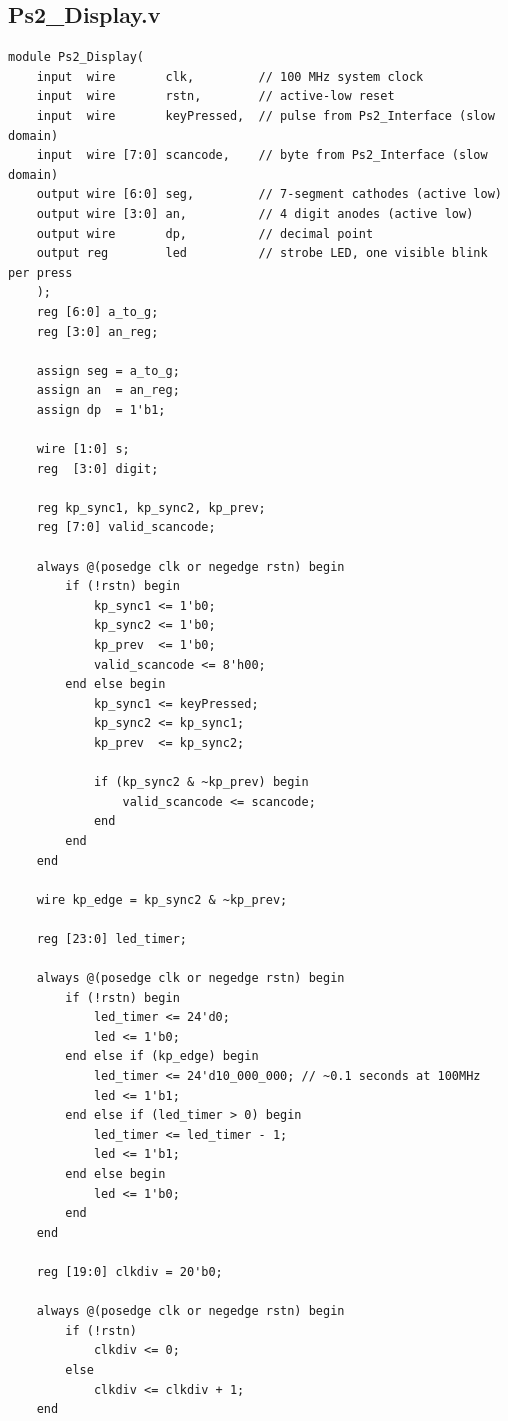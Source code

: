 \documentclass[11pt,a4paper]{article}
\begin{document}
\newpage
\subsection*{Ps2\_Display.v}
\begin{lstlisting}
module Ps2_Display(
    input  wire       clk,         // 100 MHz system clock
    input  wire       rstn,        // active-low reset
    input  wire       keyPressed,  // pulse from Ps2_Interface (slow domain)
    input  wire [7:0] scancode,    // byte from Ps2_Interface (slow domain)
    output wire [6:0] seg,         // 7-segment cathodes (active low)
    output wire [3:0] an,          // 4 digit anodes (active low)
    output wire       dp,          // decimal point
    output reg        led          // strobe LED, one visible blink per press
    );
    reg [6:0] a_to_g;
    reg [3:0] an_reg;

    assign seg = a_to_g;
    assign an  = an_reg;
    assign dp  = 1'b1;
    
    wire [1:0] s;    
    reg  [3:0] digit;

    reg kp_sync1, kp_sync2, kp_prev;
    reg [7:0] valid_scancode;
    
    always @(posedge clk or negedge rstn) begin
        if (!rstn) begin
            kp_sync1 <= 1'b0;
            kp_sync2 <= 1'b0;
            kp_prev  <= 1'b0;
            valid_scancode <= 8'h00;
        end else begin
            kp_sync1 <= keyPressed;
            kp_sync2 <= kp_sync1;
            kp_prev  <= kp_sync2;

            if (kp_sync2 & ~kp_prev) begin
                valid_scancode <= scancode;
            end
        end
    end
    
    wire kp_edge = kp_sync2 & ~kp_prev;

    reg [23:0] led_timer;
    
    always @(posedge clk or negedge rstn) begin
        if (!rstn) begin
            led_timer <= 24'd0;
            led <= 1'b0;
        end else if (kp_edge) begin
            led_timer <= 24'd10_000_000; // ~0.1 seconds at 100MHz
            led <= 1'b1;
        end else if (led_timer > 0) begin
            led_timer <= led_timer - 1;
            led <= 1'b1;
        end else begin
            led <= 1'b0;
        end
    end

    reg [19:0] clkdiv = 20'b0;
    
    always @(posedge clk or negedge rstn) begin
        if (!rstn)
            clkdiv <= 0;
        else
            clkdiv <= clkdiv + 1;
    end
    

\end{lstlisting}
\end{document}
